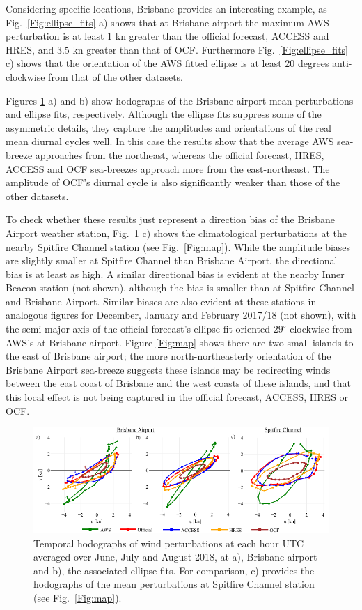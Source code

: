 \documentclass[twocol]{ametsoc}
\begin{document}
Considering specific locations, Brisbane provides an interesting example, as Fig.~\ref{Fig:ellipse_fits} a) shows that at Brisbane airport the maximum AWS perturbation is at least $1$ kn greater than the official forecast, ACCESS and HRES, and $3.5$ kn greater than that of OCF. Furthermore Fig.~\ref{Fig:ellipse_fits} c) shows that the orientation of the AWS fitted ellipse is at least 20 degrees anti-clockwise from that of the other datasets. 

Figures \ref{Fig:ellipse_hodo} a) and b) show hodographs of the Brisbane airport mean perturbations and ellipse fits, respectively. Although the ellipse fits suppress some of the asymmetric details, they capture the amplitudes and orientations of the real mean diurnal cycles well. In this case the results show that the average AWS sea-breeze approaches from the northeast, whereas the official forecast, HRES, ACCESS and OCF sea-breezes approach more from the east-northeast. The amplitude of OCF's diurnal cycle is also significantly weaker than those of the other datasets.  

To check whether these results just represent a direction bias of the Brisbane Airport weather station, Fig.~\ref{Fig:ellipse_hodo} c) shows the climatological perturbations at the nearby Spitfire Channel station (see Fig.~\ref{Fig:map}). While the amplitude biases are slightly smaller at Spitfire Channel than Brisbane Airport, the directional bias is at least as high. A similar directional bias is evident at the nearby Inner Beacon station (not shown), although the bias is smaller than at Spitfire Channel and Brisbane Airport. Similar biases are also evident at these stations in analogous figures for December, January and February 2017/18 (not shown), with the semi-major axis of the official forecast's ellipse fit oriented $29^\circ$ clockwise from AWS's at Brisbane airport. Figure \ref{Fig:map} shows there are two small islands to the east of Brisbane airport; the more north-northeasterly orientation of the Brisbane Airport sea-breeze suggests these islands may be redirecting winds between the east coast of Brisbane and the west coasts of these islands, and that this local effect is not being captured in the official forecast, ACCESS, HRES or OCF.  

\begin{figure}
\centering
\includegraphics[width=39pc]{ellipse_hodo.pdf}
\caption{Temporal hodographs of wind perturbations at each hour UTC averaged over June, July and August 2018, at a), Brisbane airport and b), the associated ellipse fits. For comparison, c) provides the hodographs of the mean perturbations at Spitfire Channel station (see Fig.~\ref{Fig:map}).}
\label{Fig:ellipse_hodo}
\end{figure}
\end{document}

